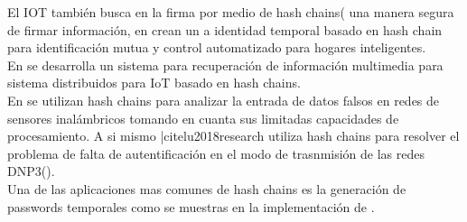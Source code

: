 \documentclass[10pt,letterpaper]{article}
\begin{document}
El IOT también busca en la firma por medio de hash chains(\cite{lamport1981password} una manera segura de firmar información, en \cite{alshahrani2019secure} crean un a identidad temporal basado en hash chain para identificación mutua y control automatizado para hogares inteligentes.\\

En \cite{jeong2020multi} se desarrolla un sistema para recuperación de información multimedia para sistema distribuidos para IoT basado en hash chains.\\

En \cite{tariq2018detection} se utilizan hash chains para analizar la entrada de datos falsos en redes de sensores inalámbricos tomando en cuanta sus limitadas capacidades de procesamiento. A si mismo |cite{lu2018research} utiliza hash chains para resolver el problema de falta de autentificación en el modo de trasnmisión de las redes DNP3(\cite{clarke2004practical}). \\

Una de las aplicaciones mas comunes de hash chains es la generación de passwords temporales como se muestras en la implementación de \cite{park2018one}.\\




\end{document}
